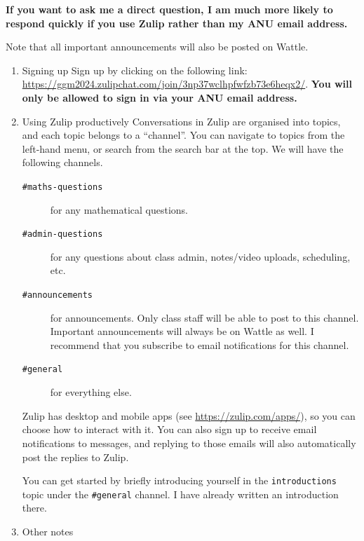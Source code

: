 \documentclass{amsart}
\begin{document}
\textbf{\textbf{If you want to ask me a direct question, I am much more likely to respond quickly if you use Zulip rather than my ANU email address.}}

Note that all important announcements will also be posted on Wattle.
\begin{enumerate}
\item Signing up
\label{sec:orga5af384}
Sign up by clicking on the following link: \url{https://ggm2024.zulipchat.com/join/3np37wclhpfwfzb73e6heqx2/}. \textbf{\textbf{You will only be allowed to sign in via your ANU email address.}}
\item Using Zulip productively
\label{sec:orgf27b37c}
Conversations in Zulip are organised into topics, and each topic belongs to a ``channel''. You can navigate to topics from the left-hand menu, or search from the search bar at the top.
We will have the following channels.

\begin{description}
\item[{\texttt{\#maths-questions}}] for any mathematical questions.
\item[{\texttt{\#admin-questions}}] for any questions about class admin, notes/video uploads, scheduling, etc.
\item[{\texttt{\#announcements}}] for announcements. Only class staff will be able to post to this channel. Important announcements will always be on Wattle as well. I recommend that you subscribe to email notifications for this channel.
\item[{\texttt{\#general}}] for everything else.
\end{description}

Zulip has desktop and mobile apps (see \url{https://zulip.com/apps/}), so you can choose how to interact with it. You can also sign up to receive email notifications to messages, and replying to those emails will also automatically post the replies to Zulip.

You can get started by briefly introducing yourself in the \texttt{introductions} topic under the \texttt{\#general} channel. I have already written an introduction there.
\item Other notes
\label{sec:orgf884aaa}


\end{enumerate}
\end{document}
